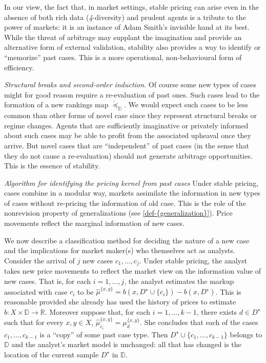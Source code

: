\documentclass[ecta,nameyear,draft]{econsocart}
\newcommand{\R}{\mathbb R}
\newcommand{\mbbd}{{\mathds D}}
\newcommand{\past}{{D^\star}}
\newcommand{\fourdiv}{\textit{4}-\textup{diversity}}
\theoremstyle{plain}
\theoremstyle{remark}
\begin{document}
%

In our view, the fact that, in market settings, stable pricing can arise even
in the absence of both rich data (\fourdiv) and prudent agents is a tribute to
the power of markets: it is an instance of Adam Smith's invisible hand at its
best. While the threat of arbitrage may supplant the imagination and provide an
alternative form of external validation, stability also provides a way to
identify or ``memorize'' past cases. This is a more operational,
non-behavioural form of efficiency.

\emph{Structural breaks and second-order induction.} Of course some new
types of cases might for good reason require a re-evaluation of past ones. Such
cases lead to the formation of a new rankings map $\grave{\preceq}_{\mbbd}$. We
would expect such cases to be less common than other forms of novel case since
they represent structural breaks or regime changes.  Agents that are
sufficiently imaginative or privately informed about such cases may be able to
profit from the associated upheaval once they arrive. But novel cases that are
``independent'' of past cases (in the sense that they do not cause a
re-evaluation) should not generate arbitrage opportunities. This is the essence
of stability.

\emph{Algorithm for identifying the pricing kernel from past cases} Under
stable pricing, cases combine in a modular way, markets assimilate the
information in new types of cases without re-pricing the information of old
case. This is the role of the nonrevision property of {generalization}s (see
\cref{def-{generalization}}).  Price movements reflect the marginal information
of new cases. 

We now describe a classification method for deciding the nature of a new case
and the implications for market maker(s) who themselves act as analysts.
Consider the arrival of $j$ new cases ${c}_1, \dots, {c}_j$.  Under stable
pricing, the analyst takes new price movements to reflect the market view on
the information value of new cases.  That is, for each $i = 1,\dots, j$, the
analyst estimates the markup associated with case $c_i$ to be
$\hat{\mu}^{\{x,y\}} = b(x, \past \cup \{c_i\}) - b(x, \past) $.  This is
reasonable provided she already has used the history of prices to estimate
$b:X\times \mbbd \rightarrow \R$. Moreover suppose that, for each $i = 1,
\dots, k-1$, there exists $d\in \past$ such that for every $x,y \in X$,
$\hat{\mu}^{\{x,y\}}_{c_i} = \mu^{\{x,y\}}_{d}$.  She concludes that each of
the cases $c_1, \dots, c_{k-1}$ is a ``copy'' of some past case type. Then
$\past \cup \{c_1, \dots, c_{k-1}\}$ belongs to $\mbbd$ and the analyst's
market model is unchanged: all that has changed is the location of the current
sample $\past$ in $\mbbd$.
\end{document}
